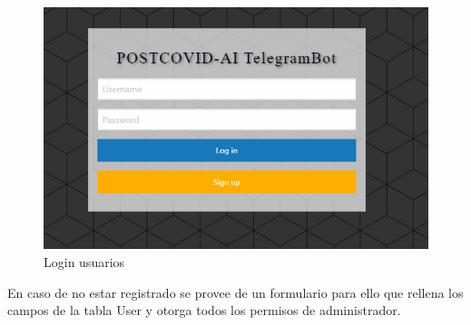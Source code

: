 \begin{figure}[!ht]
    \centering
    \includegraphics[width=1\textwidth]{imagenes/login.png}
    \caption{ Login usuarios }
    \label{fig:enter-label}
\end{figure}
\vspace{1cm}

En caso de no estar registrado se provee de un formulario para ello que rellena los campos de la tabla User y otorga todos los permisos de administrador. \vspace{0.3cm}



